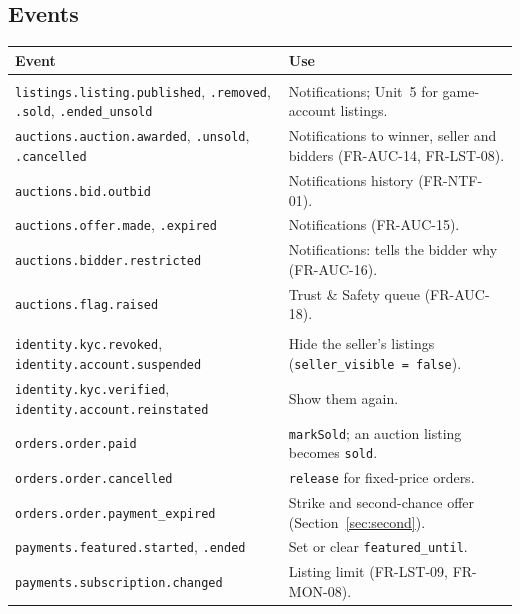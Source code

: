 \documentclass[11pt,a4paper]{article}
\newenvironment{dtable}[1]{\small\begin{longtable}{#1}}{\end{longtable}}
\begin{document}
\subsection{Events}
\begin{dtable}{@{}>{\raggedright\arraybackslash}p{6.4cm}>{\raggedright\arraybackslash}p{8.8cm}@{}}
\toprule
\textbf{Event} & \textbf{Use} \\ \midrule \endhead
\multicolumn{2}{@{}l}{\textit{Published (outbox, DC-6)}} \\
\texttt{listings.listing.published}, \texttt{.removed}, \texttt{.sold}, \texttt{.ended\_unsold} & Notifications; Unit~5 for game-account listings. \\
\texttt{auctions.auction.awarded}, \texttt{.unsold}, \texttt{.cancelled} & Notifications to winner, seller and bidders (FR-AUC-14, FR-LST-08). \\
\texttt{auctions.bid.outbid} & Notifications history (FR-NTF-01). \\
\texttt{auctions.offer.made}, \texttt{.expired} & Notifications (FR-AUC-15). \\
\texttt{auctions.bidder.restricted} & Notifications: tells the bidder why (FR-AUC-16). \\
\texttt{auctions.flag.raised} & Trust \& Safety queue (FR-AUC-18). \\
\multicolumn{2}{@{}l}{\textit{Consumed (idempotent)}} \\
\texttt{identity.kyc.revoked}, \texttt{identity.account.suspended} & Hide the seller's listings (\texttt{seller\_visible = false}). \\
\texttt{identity.kyc.verified}, \texttt{identity.account.reinstated} & Show them again. \\
\texttt{orders.order.paid} & \texttt{markSold}; an auction listing becomes \texttt{sold}. \\
\texttt{orders.order.cancelled} & \texttt{release} for fixed-price orders. \\
\texttt{orders.order.payment\_expired} & Strike and second-chance offer (Section~\ref{sec:second}). \\
\texttt{payments.featured.started}, \texttt{.ended} & Set or clear \texttt{featured\_until}. \\
\texttt{payments.subscription.changed} & Listing limit (FR-LST-09, FR-MON-08). \\
\bottomrule
\end{dtable}
\end{document}
